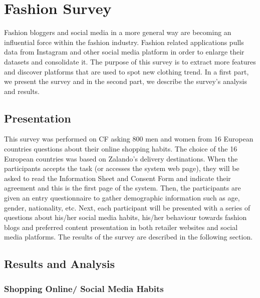 \chapter{Fashion Survey}
\label{chap:survey}

Fashion bloggers and social media in a more general way are becoming an influential force within the fashion industry. Fashion related applications pulls data from Instagram and other social media platform in order to enlarge their datasets and consolidate it. The purpose of this survey is to extract more features and discover platforms that are used to spot new clothing trend. In a first part, we present the survey and in the second part, we describe the survey’s analysis and results.

\section{Presentation}
This survey was performed on \ac{CF} asking 800 men and women from 16 European countries questions about their online shopping habits. The choice of the 16 European countries was based on Zalando’s delivery destinations. When the participants accepts the task (or accesses the system web page), they will be asked to read the Information Sheet and Consent Form and indicate their agreement and this is the first page of the system. Then, the participants are given an entry questionnaire to gather demographic information such as age, gender, nationality, etc. Next, each participant will be presented with a series of questions about his/her social media habits, his/her behaviour towards fashion blogs and preferred content presentation in both retailer websites and social media platforms. The results of the survey are described in the following section.

\section{Results and Analysis}
\subsection{Shopping Online/ Social Media Habits}


